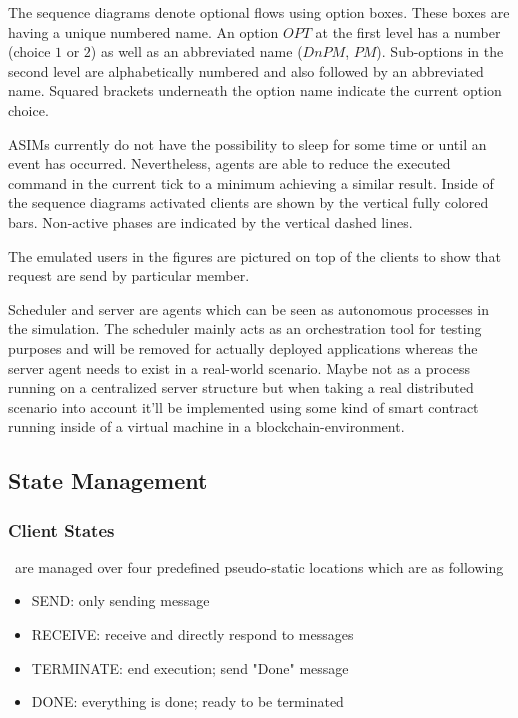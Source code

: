 The sequence diagrams denote optional flows using option boxes. These boxes are having a unique numbered name. An option $OPT$ at the first level has a number (choice $1$ or $2$) as well as an abbreviated name ($DnPM$, $PM$). Sub-options in the second level are alphabetically numbered and also followed by an abbreviated name. Squared brackets underneath the option name indicate the current option choice.

ASIMs currently do not have the possibility to sleep for some time or until an event has occurred. Nevertheless, agents are able to reduce the executed command in the current tick to a minimum achieving a similar result. Inside of the sequence diagrams activated clients are shown by the vertical fully colored bars. Non-active phases are indicated by the vertical dashed lines.

The emulated users in the figures are pictured on top of the clients to show that request are send by particular member.

Scheduler and server are agents which can be seen as autonomous processes in the simulation. The scheduler mainly acts as an orchestration tool for testing purposes and will be removed for actually deployed applications whereas the server agent needs to exist in a real-world scenario. Maybe not as a process running on a centralized server structure but when taking a real distributed scenario into account it'll be implemented using some kind of smart contract running inside of a virtual machine in a blockchain-environment.

\subsection{State Management}
\label{subsec:impl-states}

\subsubsection{Client States}\ are managed over four predefined pseudo-static locations which are as following

\begin{itemize}
	\item SEND: only sending message
	\item RECEIVE: receive and directly respond to messages
	\item TERMINATE: end execution; send "Done" message
	\item DONE: everything is done; ready to be terminated
\end{itemize}

